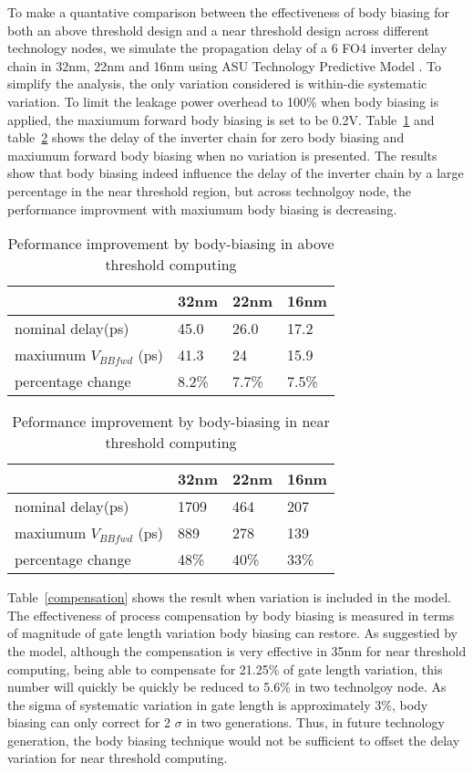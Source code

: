 To make a quantative comparison between the effectiveness of body biasing for both an
above threshold design and a near threshold design across different technology
nodes,  we simulate the propagation  delay of a 6 FO4 inverter delay chain in
32nm, 22nm and 16nm using ASU Technology Predictive Model \cite{PredictiveModel}. To simplify the
analysis, the only variation considered is within-die systematic variation. To limit the leakage power overhead to 100\% when body biasing is applied, the maxiumum forward body biasing is set to be 0.2V.  Table~\ref{body1} and table~\ref{body2} shows the delay of the inverter chain for zero body biasing and maxiumum forward body biasing when no variation is presented. The results show that body biasing indeed influence the delay of the inverter chain by a large percentage in the near threshold region, but across technolgoy node, the performance improvment with maxiumum body biasing is decreasing.   


\begin{table}
  \caption {Peformance improvement by body-biasing in above threshold computing} 
  \centering 
  \label {body1}
  \begin{tabular}{ | l | l | l | l | }
    \hline
    & 32nm & 22nm & 16nm \\ \hline
    nominal delay(ps) & 45.0 & 26.0 & 17.2 \\ \hline
    maxiumum $V_{BBfwd}$ (ps)  & 41.3 & 24 & 15.9 \\  \hline
    percentage change  & 8.2\% & 7.7\% & 7.5\% \\ 
    \hline
  \end{tabular}
\end{table}



\begin{table}
  \caption {Peformance improvement by body-biasing in near threshold computing}  
  \centering
  \label {body2}
  \begin{tabular}{ | l | l | l | l | }
    \hline
    & 32nm & 22nm & 16nm \\ \hline
    nominal delay(ps) & 1709 & 464 & 207 \\ \hline
    maxiumum $V_{BBfwd}$ (ps)  & 889 & 278 & 139 \\  \hline
    percentage change  & 48\% & 40\% & 33\% \\ 
    \hline
  \end{tabular}
\end{table}

Table~\ref{compensation} shows the result when variation is included in the model. The effectiveness of process compensation by body biasing is measured in terms of magnitude of gate length variation body biasing can restore. As suggestied by the model, although the compensation is very effective in 35nm for near threshold computing, being able to compensate for 21.25\% of gate length variation, this number will quickly be quickly be reduced to 5.6\% in two technolgoy node. As the sigma of systematic variation in gate length is approximately 3\%, body biasing can only correct for 2 $\sigma$ in two generations. Thus, in future technology generation, the body biasing technique would not be sufficient to offset the delay variation for near threshold computing.    

